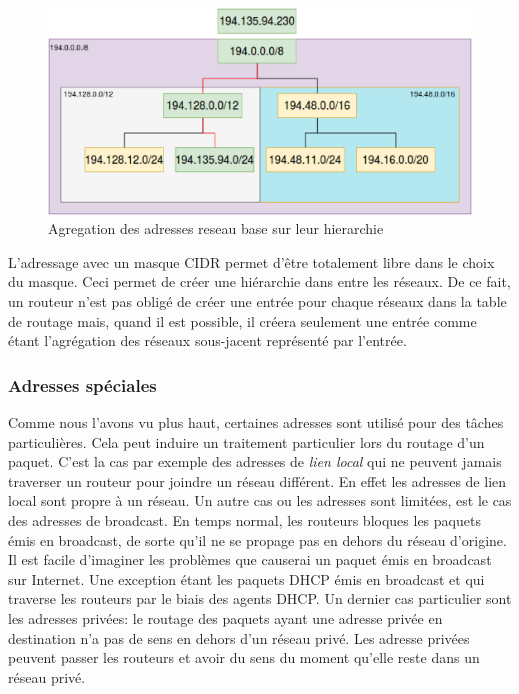 \begin{figure}
\centering
\includegraphics[width=15cm]{./pics/routagecidr.eps}
\caption{Agregation des adresses reseau base sur leur hierarchie}
\label{fig:routcidr}
\end{figure}

L'adressage avec un masque CIDR permet d'être totalement libre dans le choix du
masque. Ceci permet de créer une hiérarchie dans entre les réseaux. De ce fait,
un routeur n'est pas obligé de créer une entrée pour chaque réseaux dans la
table de routage mais, quand il est possible, il créera seulement une entrée
comme étant l'agrégation des réseaux sous-jacent représenté par l'entrée.

\subsubsection{Adresses spéciales}

Comme nous l'avons vu plus haut, certaines adresses sont utilisé pour des
tâches particulières. Cela peut induire un traitement particulier lors du routage
d'un paquet.  C'est la cas par exemple des adresses de {\it lien local} qui ne
peuvent jamais traverser un routeur pour joindre un réseau différent. En effet
les adresses de lien local sont propre à un réseau.
Un autre cas ou les adresses sont limitées, est le cas des adresses de broadcast.
En temps normal, les routeurs bloques les paquets émis en broadcast, de sorte qu'il ne se propage pas en dehors du réseau d'origine. Il est facile d'imaginer les problèmes que causerai un paquet émis en broadcast sur Internet. Une exception étant les paquets DHCP émis en broadcast et qui traverse les routeurs par le biais des agents DHCP.
Un dernier cas particulier sont les adresses privées: le routage des paquets ayant une adresse privée en destination n'a pas de sens en dehors d'un réseau privé. Les adresse privées peuvent passer les routeurs et avoir du sens du moment qu'elle reste dans un réseau privé.
